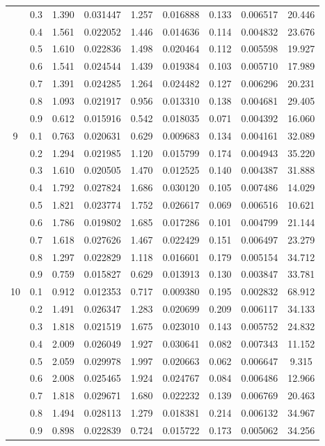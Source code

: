 \begin{longtable}{ | c | c || c | c | c | c | c | c | c | }
 & 0.3 & 1.390 & 0.031447 & 1.257 & 0.016888 & 0.133 & 0.006517 & 20.446 \\
 & 0.4 & 1.561 & 0.022052 & 1.446 & 0.014636 & 0.114 & 0.004832 & 23.676 \\
 & 0.5 & 1.610 & 0.022836 & 1.498 & 0.020464 & 0.112 & 0.005598 & 19.927 \\
 & 0.6 & 1.541 & 0.024544 & 1.439 & 0.019384 & 0.103 & 0.005710 & 17.989 \\
 & 0.7 & 1.391 & 0.024285 & 1.264 & 0.024482 & 0.127 & 0.006296 & 20.231 \\
 & 0.8 & 1.093 & 0.021917 & 0.956 & 0.013310 & 0.138 & 0.004681 & 29.405 \\
 & 0.9 & 0.612 & 0.015916 & 0.542 & 0.018035 & 0.071 & 0.004392 & 16.060 \\
 \hline
\multirow{9}{*}{9} & 0.1 & 0.763 & 0.020631 & 0.629 & 0.009683 & 0.134 & 0.004161 & 32.089 \\
 & 0.2 & 1.294 & 0.021985 & 1.120 & 0.015799 & 0.174 & 0.004943 & 35.220 \\
 & 0.3 & 1.610 & 0.020505 & 1.470 & 0.012525 & 0.140 & 0.004387 & 31.888 \\
 & 0.4 & 1.792 & 0.027824 & 1.686 & 0.030120 & 0.105 & 0.007486 & 14.029 \\
 & 0.5 & 1.821 & 0.023774 & 1.752 & 0.026617 & 0.069 & 0.006516 & 10.621 \\
 & 0.6 & 1.786 & 0.019802 & 1.685 & 0.017286 & 0.101 & 0.004799 & 21.144 \\
 & 0.7 & 1.618 & 0.027626 & 1.467 & 0.022429 & 0.151 & 0.006497 & 23.279 \\
 & 0.8 & 1.297 & 0.022829 & 1.118 & 0.016601 & 0.179 & 0.005154 & 34.712 \\
 & 0.9 & 0.759 & 0.015827 & 0.629 & 0.013913 & 0.130 & 0.003847 & 33.781 \\
 \hline
\multirow{9}{*}{10} & 0.1 & 0.912 & 0.012353 & 0.717 & 0.009380 & 0.195 & 0.002832 & 68.912 \\
 & 0.2 & 1.491 & 0.026347 & 1.283 & 0.020699 & 0.209 & 0.006117 & 34.133 \\
 & 0.3 & 1.818 & 0.021519 & 1.675 & 0.023010 & 0.143 & 0.005752 & 24.832 \\
 & 0.4 & 2.009 & 0.026049 & 1.927 & 0.030641 & 0.082 & 0.007343 & 11.152 \\
 & 0.5 & 2.059 & 0.029978 & 1.997 & 0.020663 & 0.062 & 0.006647 & 9.315 \\
 & 0.6 & 2.008 & 0.025465 & 1.924 & 0.024767 & 0.084 & 0.006486 & 12.966 \\
 & 0.7 & 1.818 & 0.029671 & 1.680 & 0.022232 & 0.139 & 0.006769 & 20.463 \\
 & 0.8 & 1.494 & 0.028113 & 1.279 & 0.018381 & 0.214 & 0.006132 & 34.967 \\
 & 0.9 & 0.898 & 0.022839 & 0.724 & 0.015722 & 0.173 & 0.005062 & 34.256 \\
 \hline
\hline
\end{longtable}
 
